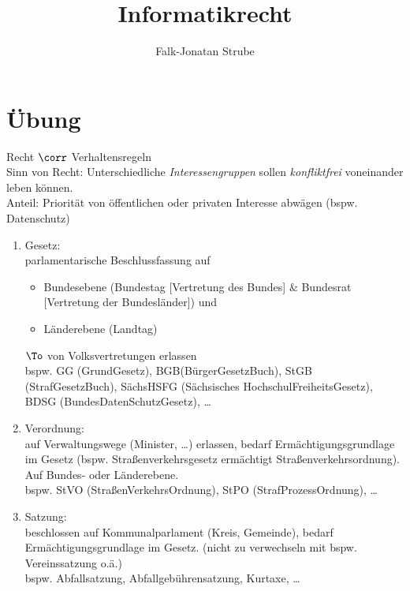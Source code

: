 \documentclass{scrreprt}
\title{Informatikrecht}
\author{Falk-Jonatan Strube}
\begin{document}
\maketitle
\tableofcontents
\part{Übung}
Recht $\corr$ Verhaltensregeln\\
Sinn von Recht: Unterschiedliche \emph{Interessengruppen} sollen \emph{konfliktfrei} voneinander leben können.\\
Anteil: Priorität von öffentlichen oder privaten Interesse abwägen (bspw. Datenschutz)

\begin{enumerate}
\item Gesetz:\\
parlamentarische Beschlussfassung auf
\begin{itemize}
\item Bundesebene (Bundestag [Vertretung des Bundes] \& Bundesrat [Vertretung der Bundesländer]) und 
\item Länderebene (Landtag) 
\end{itemize}
$\To$ von Volksvertretungen erlassen\\
bspw. GG (GrundGesetz), BGB(BürgerGesetzBuch), StGB (StrafGesetzBuch), SächsHSFG (Sächsisches HochschulFreiheitsGesetz), BDSG (BundesDatenSchutzGesetz), …
\item Verordnung:\\
auf Verwaltungswege (Minister, …) erlassen, bedarf Ermächtigungsgrundlage im Gesetz (bspw. Straßenverkehrsgesetz ermächtigt Straßenverkehrsordnung). Auf Bundes- oder Länderebene.\\
bspw. StVO (StraßenVerkehrsOrdnung), StPO (StrafProzessOrdnung), …
\item Satzung:\\
beschlossen auf Kommunalparlament (Kreis, Gemeinde), bedarf Ermächtigungsgrundlage im Gesetz. (nicht zu verwechseln mit bspw. Vereinssatzung o.ä.)\\
bspw. Abfallsatzung, Abfallgebührensatzung, Kurtaxe, …
\end{enumerate}
\end{document}
